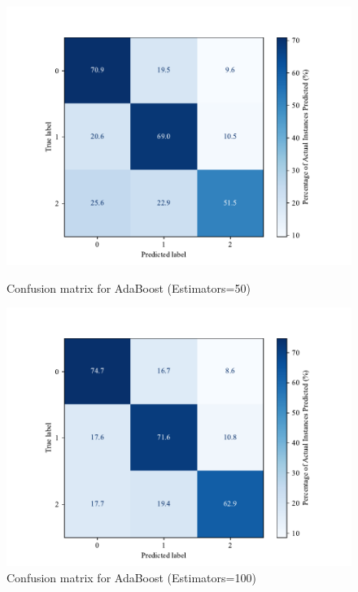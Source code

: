     \begin{figure}[H]
        \centering
        \begin{minipage}[b]{0.45\textwidth}
        \centering
        \includegraphics[width=\textwidth]{images/confusion_matrix_adaboost50.pdf}
        \caption{Confusion matrix for AdaBoost (Estimators=50)}
        \label{fig:confusion_adaboost_50}
        \end{minipage}
        \hfill
        \begin{minipage}[b]{0.45\textwidth}
        \centering
        \includegraphics[width=\textwidth]{images/confusion_matrix_adaboost100.pdf}
        \caption{Confusion matrix for AdaBoost (Estimators=100)}
        \label{fig:confusion_adaboost_100}
        \end{minipage}
        \end{figure}
        
